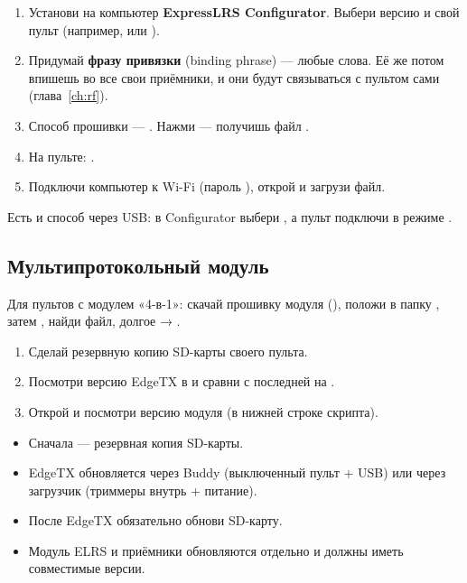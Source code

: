 \begin{enumerate}
  \item Установи на компьютер \textbf{ExpressLRS Configurator}. Выбери версию и свой пульт
        (например,  или ).
  \item Придумай \textbf{фразу привязки} (binding phrase) --- любые слова. Её же потом впишешь
        во все свои приёмники, и они будут связываться с пультом сами (глава~\ref{ch:rf}).
  \item Способ прошивки --- . Нажми  --- получишь файл .
  \item На пульте: .
  \item Подключи компьютер к Wi-Fi  (пароль ),
        открой  и загрузи файл.
\end{enumerate}

Есть и способ через USB: в Configurator выбери , а пульт подключи в
режиме .

\subsection{Мультипротокольный модуль}

Для пультов с модулем «4-в-1»: скачай прошивку модуля (), положи в папку
, затем , найди файл, долгое  →
.

\begin{tryit}
\begin{enumerate}
  \item Сделай резервную копию SD-карты своего пульта.
  \item Посмотри версию EdgeTX в  и сравни с последней на .
  \item Открой  и посмотри версию модуля
        (в нижней строке скрипта).
\end{enumerate}
\end{tryit}

\begin{summary}
\begin{itemize}
  \item Сначала --- резервная копия SD-карты.
  \item EdgeTX обновляется через Buddy (выключенный пульт + USB) или через загрузчик
        (триммеры внутрь + питание).
  \item После EdgeTX обязательно обнови SD-карту.
  \item Модуль ELRS и приёмники обновляются отдельно и должны иметь совместимые версии.
\end{itemize}
\end{summary}
